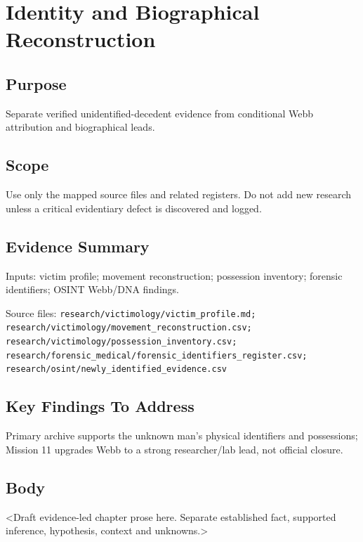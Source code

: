 
\chapter{Identity and Biographical Reconstruction}
\label{chap:04-identity-biography}


\section{Purpose}
Separate verified unidentified-decedent evidence from conditional Webb attribution and biographical leads.

\section{Scope}
Use only the mapped source files and related registers. Do not add new research unless a critical evidentiary defect is discovered and logged.

\section{Evidence Summary}
Inputs: victim profile; movement reconstruction; possession inventory; forensic identifiers; OSINT Webb/DNA findings.

Source files: \texttt{research/victimology/victim_profile.md; research/victimology/movement_reconstruction.csv; research/victimology/possession_inventory.csv; research/forensic_medical/forensic_identifiers_register.csv; research/osint/newly_identified_evidence.csv}

\section{Key Findings To Address}
Primary archive supports the unknown man's physical identifiers and possessions; Mission 11 upgrades Webb to a strong researcher/lab lead, not official closure.

\section{Body}
<Draft evidence-led chapter prose here. Separate established fact, supported inference, hypothesis, context and unknowns.>

